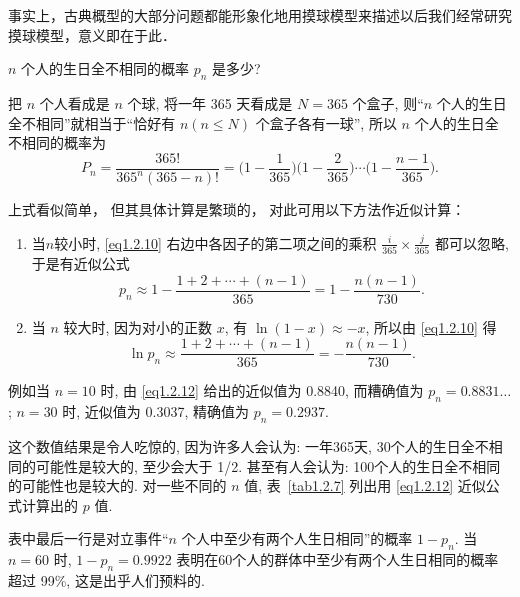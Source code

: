 \begin{note}
    事实上，古典概型的大部分问题都能形象化地用摸球模型来描述以后我们经常研究摸球模型，意义即在于此．
\end{note}

\begin{example}[生日问题]
    $n$ 个人的生日全不相同的概率 $p_n$ 是多少?
\end{example}

\begin{solution}
    把 $n$ 个人看成是 $n$ 个球,
    将一年 365 天看成是 $N=365$ 个盒子,
    则“$n$ 个人的生日全不相同”就相当于“恰好有 $n (n \le N)$ 个盒子各有一球”,
    所以 $n$ 个人的生日全不相同的概率为
    \begin{equation}
        P_n = \frac{365!}{365^n (365 - n)!}
        = \biggl(1 - \frac{1}{365}\biggr) \biggl(1 - \frac{2}{365}\biggr)
        \dotsb \biggl(1 - \frac{n - 1}{365}\biggr).
        \label{eq1.2.10}
    \end{equation}

    上式看似简单，
    但其具体计算是繁琐的，
    对此可用以下方法作近似计算：

    \begin{enumerate}
        \item 当$n$较小时,
              \eqref{eq1.2.10} 右边中各因子的第二项之间的乘积 $\frac{i}{365} \times \frac{j}{365}$ 都可以忽略,
              于是有近似公式
              \begin{equation}
                  p_n \approx 1 - \frac{1 + 2 + \dotsb + (n - 1)}{365}
                  = 1 - \frac{n (n - 1)}{730}.
                  \label{eq1.2.11}
              \end{equation}

        \item 当 $n$ 较大时,
              因为对小的正数 $x$,
              有 $\ln (1-x) \approx -x$,
              所以由 \eqref{eq1.2.10} 得
              \begin{equation}
                  \ln p_n \approx \frac{1 + 2 + \dotsb + (n - 1)}{365}
                  = -\frac{n (n - 1)}{730}.
                  \label{eq1.2.12}
              \end{equation}
    \end{enumerate}

    例如当 $n = 10$ 时,
    由 \eqref{eq1.2.12} 给出的近似值为 \num{0.8840},
    而糟确值为 $p_n = 0.8831\dots$;
    $n = 30$ 时,
    近似值为 \num{0.3037},
    精确值为 $p_n = 0.2937$.

    这个数值结果是令人吃惊的,
    因为许多人会认为:
    一年365天,
    30个人的生日全不相同的可能性是较大的,
    至少会大于 1/2.
    甚至有人会认为:
    100个人的生日全不相同的可能性也是较大的.
    对一些不同的 $n$ 值,
    表~\ref{tab1.2.7} 列出用 \eqref{eq1.2.12} 近似公式计算出的 $p$ 值.



    表中最后一行是对立事件“$n$ 个人中至少有两个人生日相同”的概率 $1 - p_n$.
    当 $n = 60$ 时,
    $1 - p_n = 0.9922$ 表明在60个人的群体中至少有两个人生日相同的概率超过 99\%,
    这是出乎人们预料的.
\end{solution}

